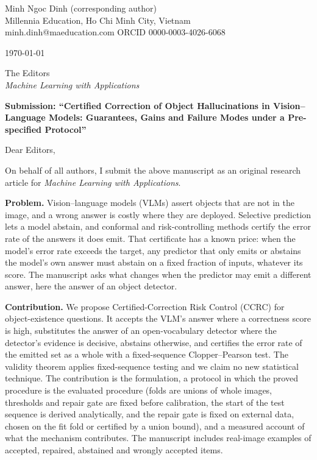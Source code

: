 \documentclass[10.5pt,a4paper]{article}
\begin{document}
Minh Ngoc Dinh (corresponding author)\\
Millennia Education, Ho Chi Minh City, Vietnam\\
minh.dinh@maeducation.com \quad ORCID 0000-0003-4026-6068

\today

The Editors\\
\emph{Machine Learning with Applications}

\textbf{Submission: ``Certified Correction of Object Hallucinations in Vision--Language Models: Guarantees, Gains and Failure Modes under a Pre-specified Protocol''}

Dear Editors,

On behalf of all authors, I submit the above manuscript as an original research article for \emph{Machine Learning with Applications}.

\textbf{Problem.} Vision--language models (VLMs) assert objects that are not in the image, and a wrong answer is costly where they are deployed. Selective prediction lets a model abstain,
and conformal and risk-controlling methods certify the error rate of the answers it does emit. That certificate has a known price: when the model's error rate exceeds the target, any predictor that only emits
or abstains the model's own answer must abstain on a fixed fraction of inputs, whatever its score. The manuscript asks what changes when the predictor may emit a different answer, here the answer of an object detector.

\textbf{Contribution.} We propose Certified-Correction Risk Control (CCRC) for object-existence questions. It accepts the VLM's answer where a correctness score is high, substitutes the answer of an
open-vocabulary detector where the detector's evidence is decisive, abstains otherwise, and certifies the error rate of the emitted set as a whole with a fixed-sequence Clopper--Pearson test. The validity theorem
applies fixed-sequence testing and we claim no new statistical technique. The contribution is the formulation, a protocol in which the proved procedure is the evaluated procedure (folds are unions of whole images, thresholds and repair gate are fixed
before calibration, the start of the test sequence is derived analytically, and the repair gate is fixed on external data, chosen on the fit fold or certified by a union bound), and a measured account of what the mechanism contributes.
The manuscript includes real-image examples of accepted, repaired, abstained and wrongly accepted items.
\end{document}
